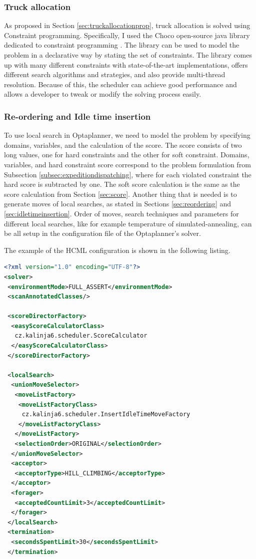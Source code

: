 \documentclass{ctuthesis}
\begin{document}
\subsubsection{Truck allocation}

As proposed in Section \ref{sec:truckallocationprop}, truck allocation is solved using Constraint programming. Specifically, I used the Choco open-source java library dedicated to constraint programming \cite{choco}. The library can be used to model the problem in a declarative way by stating the set of constraints. The library comes up with many different constraints with state-of-the-art implementations, offers different search algorithms and strategies, and also provide multi-thread resolution. Because of this, the scheduler can achieve good performance and allows a developer to tweak or modify the solving process easily. 

\subsubsection{Re-ordering and Idle time insertion}

To use local search in Optaplanner, we need to model the problem by specifying domains, variables, and the calculation of the score. The score consists of two long values, one for hard constraints and the other for soft constraint. Domains, variables, and hard constraint score correspond to the problem formulation from Subsection \ref{subsec:expeditiondispatching}, where for each violated constraint the hard score is subtracted by one. The soft score calculation is the same as the score calculation from Section \ref{sec:score}.
Another thing that is needed is to generate moves of local searches, as stated in Sections \ref{sec:reordering} and \ref{sec:idletimeinsertion}. Order of moves, search techniques and parameters for different local searches, like for example temperature of simulated-annealing, can be all setup in the configuration file of the Optaplanner's solver.

The example of the HCML configuration is shown in the following listing.


\begin{lstlisting}[language=XML, caption=Optaplanner local search configuration]
<?xml version="1.0" encoding="UTF-8"?>
<solver>
 <environmentMode>FULL_ASSERT</environmentMode>
 <scanAnnotatedClasses/>

 <scoreDirectorFactory>
  <easyScoreCalculatorClass>
   cz.kalinja6.scheduler.ScoreCalculator
  </easyScoreCalculatorClass>
 </scoreDirectorFactory>

 <localSearch>
  <unionMoveSelector>
   <moveListFactory>
    <moveListFactoryClass>
     cz.kalinja6.scheduler.InsertIdleTimeMoveFactory
    </moveListFactoryClass>
   </moveListFactory>
   <selectionOrder>ORIGINAL</selectionOrder>
  </unionMoveSelector>
  <acceptor>
   <acceptorType>HILL_CLIMBING</acceptorType>
  </acceptor>
  <forager>
   <acceptedCountLimit>3</acceptedCountLimit>
  </forager>
 </localSearch>
 <termination>
  <secondsSpentLimit>30</secondsSpentLimit>
 </termination>
\end{lstlisting}
\end{document}
